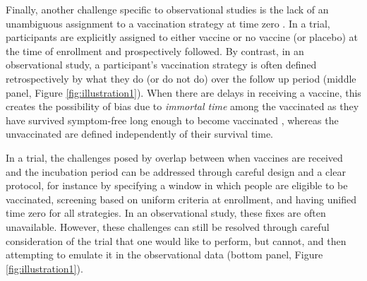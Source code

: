 \documentclass[11pt]{article}
\begin{document}
Finally, another challenge specific to observational studies is the lack of an unambiguous assignment to a vaccination strategy at time zero \cite{hernan_how_2018}. In a trial, participants are explicitly assigned to either vaccine or no vaccine (or placebo) at the time of enrollment and prospectively followed. By contrast, in an observational study, a participant's vaccination strategy is often defined retrospectively by what they do (or do not do) over the follow up period (middle panel, Figure \ref{fig:illustration1}). When there are delays in receiving a vaccine, this creates the possibility of bias due to \textit{immortal time} among the vaccinated as they have survived symptom-free long enough to become vaccinated \cite{suissa_immortal_2008}, whereas the unvaccinated are defined independently of their survival time. 

In a trial, the challenges posed by overlap between when vaccines are received and the incubation period can be addressed through careful design and a clear protocol, for instance by specifying a window in which people are eligible to be vaccinated, screening based on uniform criteria at enrollment, and having unified time zero for all strategies. In an observational study, these fixes are often unavailable. However, these challenges can still be resolved through careful consideration of the trial that one would like to perform, but cannot, and then attempting to emulate it in the observational data (bottom panel, Figure \ref{fig:illustration1}).
\end{document}

